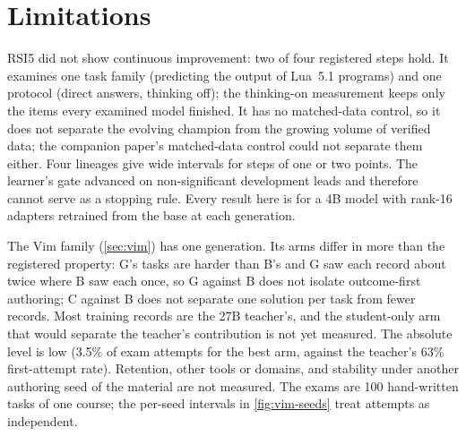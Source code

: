 \section{Limitations}\label{sec:limitations}

RSI5 did not show continuous improvement: two of four registered steps hold. It examines one task family (predicting the output
of Lua~5.1 programs) and one protocol (direct answers, thinking off); the thinking-on measurement keeps only the items every
examined model finished. It has no matched-data control, so it does not separate the evolving champion from
the growing volume of verified data; the companion paper's matched-data control could not separate them either. Four lineages
give wide intervals for steps of one or two points. The learner's gate advanced on non-significant development leads and
therefore cannot serve as a stopping rule. Every result here is for a 4B model with rank-16 adapters retrained from the base at
each generation.

The Vim family (\cref{sec:vim}) has one generation. Its arms differ in more than the registered property: G's tasks are
harder than B's and G saw each record about twice where B saw each once, so G against B does not isolate outcome-first
authoring; C against B does not separate one solution per task from fewer records. Most training records are the 27B
teacher's, and the student-only arm that would separate the teacher's contribution is not yet measured. The absolute level is
low (3.5\% of exam attempts for the best arm, against the teacher's 63\% first-attempt rate). Retention, other tools or domains,
and stability under another authoring seed of the material are not measured. The exams are 100 hand-written tasks of one
course; the per-seed intervals in \cref{fig:vim-seeds} treat attempts as independent.
